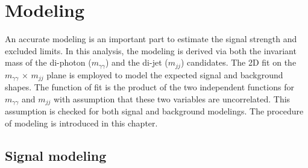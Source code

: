 \chapter{Modeling}

\label{Chapter5}

An accurate modeling is an important part to estimate the signal strength and excluded limits.
In this analysis, the modeling is derived via both the invariant mass of the di-photon ($m_{\gamma\gamma}$) and the di-jet ($m_{jj}$) candidates.
The 2D fit on the $m_{\gamma\gamma}$ $\times$ $m_{jj}$ plane is employed to model the expected signal and background shapes.
The function of fit is the product of the two independent functions for $m_{\gamma\gamma}$ and $m_{jj}$ with assumption that these two variables are uncorrelated.
This assumption is checked for both signal and background modelings. %
The procedure of modeling is introduced in this chapter.


\section{Signal modeling}\label{sec:SigModling}

